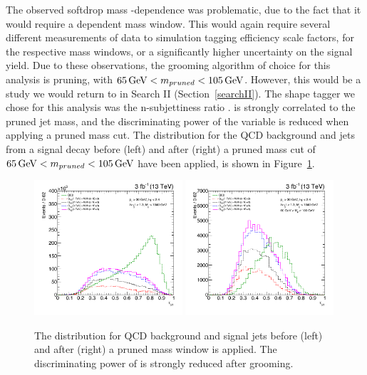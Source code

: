 The observed softdrop mass \PT-dependence was problematic, due to the fact that it would require a \PT dependent mass window. This would again require several different measurements of data to simulation tagging efficiency scale factors, for the respective mass windows, or a significantly higher uncertainty on the signal yield. Due to these observations, the grooming algorithm of choice for this analysis is pruning, with $65 \,\text{Ge\hspace{-.08em}V} < m_{pruned} < 105 \,\text{Ge\hspace{-.08em}V}$. However, this would be a study we would return to in Search II (Section~\ref{searchII}).
\newline\newline
The shape tagger we chose for this analysis was the n-subjettiness ratio \nsubj. \nsubj is strongly correlated to the pruned jet mass, and the discriminating power of the variable is reduced when applying a pruned mass cut. The \nsubj distribution for the QCD background and \PW jets from a signal decay before (left) and after (right) a pruned mass cut of $65 \,\text{Ge\hspace{-.08em}V} < m_{pruned} < 105 \,\text{Ge\hspace{-.08em}V}$ have been applied, is shown in Figure~\ref{fig:searchI:tau21_groomedvsungroomed}.

\begin{figure}[h!]
\centering
\includegraphics[width=0.49\textwidth]{figures/analysis/search1/misc/tau21_ungroomed.pdf}
\includegraphics[width=0.49\textwidth]{figures/analysis/search1/misc/tau21_groomed.pdf}
\caption{The \nsubj distribution for QCD background and signal jets before (left) and after (right) a pruned mass window is applied. The discriminating power of \nsubj is strongly reduced after grooming.}
\label{fig:searchI:tau21_groomedvsungroomed}
\end{figure}

